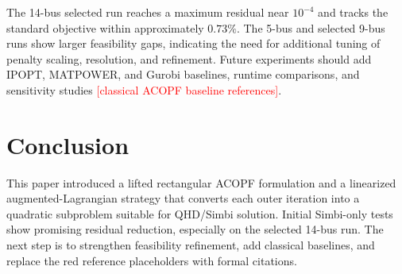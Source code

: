 \documentclass[conference]{IEEEtran}
\newcommand{\needref}[1]{\textcolor{red}{[#1]}}
\begin{document}
The 14-bus selected run reaches a maximum residual near $10^{-4}$ and tracks the standard objective within approximately $0.73\%$. The 5-bus and selected 9-bus runs show larger feasibility gaps, indicating the need for additional tuning of penalty scaling, resolution, and refinement. Future experiments should add IPOPT, MATPOWER, and Gurobi baselines, runtime comparisons, and sensitivity studies \needref{classical ACOPF baseline references}.

\section{Conclusion}
This paper introduced a lifted rectangular ACOPF formulation and a linearized augmented-Lagrangian strategy that converts each outer iteration into a quadratic subproblem suitable for QHD/Simbi solution. Initial Simbi-only tests show promising residual reduction, especially on the selected 14-bus run. The next step is to strengthen feasibility refinement, add classical baselines, and replace the red reference placeholders with formal citations.
\end{document}
